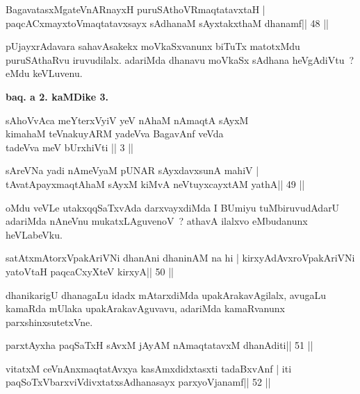 \begin{shl}
BagavatasxMgateVnARnayxH puruSAthoVR\s maqtatavxtaH |
paqcACxmayxtoV\s maqtatavxsayx sAdhanaM sAyxtakxthaM dhanamf\hfill || 48 ||
\end{shl}

\begin{artha}
pUjayxrAdavara sahavAsakekx moVkaSxvanunx biTuTx matotxMdu puruSAthaRvu iruvudilalx. adariMda dhanavu moVkaSx sAdhana heVgAdiVtu~? eMdu keVLuvenu.
\end{artha}

\begin{center}
\textbf{baq. a 2. kaMDike 3.}
\end{center}

\begin{shl}
sAhoVvAca meYterxVyiV yeV nAhaM nAmaqtA sAyxM\\
kimahaM teVnakuyARM yadeVva BagavAnf veVda\\
tadeVva meV bUrxhiVti || 3 ||
\end{shl}

\begin{shl}
sAreVNa yadi nAmeVyaM pUNAR sAyxdavxsunA mahiV |
tAvatA\s payxmaqtA\s haM sAyxM kiMvA neVtuyxcayxtAM yathA\hfill || 49 ||
\end{shl}

\begin{artha}
oMdu veVLe utakxqqSaTxvAda darxvayxdiMda I BUmiyu tuMbiruvudAdarU adariMda nAneVnu mukatxLAguvenoV~? athavA ilalxvo eMbudanunx heVLabeVku.
\end{artha}

\begin{shl}
satAtxmAtorxVpakAriVNi dhanAni dhaninAM na hi |
kirxyAdAvxroVpakAriVNi yatoV\s taH paqcaCxyXteV kirxyA\hfill || 50 ||
\end{shl}

\begin{artha}
dhanikarigU dhanagaLu idadx mAtarxdiMda upakArakavAgilalx, avugaLu
kamaRda mUlaka upakArakavAguvavu, adariMda kamaRvanunx
parxshinxsutetxVne.
\end{artha}


\begin{shl}
parxtAyxha paqSaTxH sAvxM jAyAM nAmaqtatavxM dhanAditi\hfill || 51 ||
\end{shl}

\begin{shl}
vitatxM ceVnAnxmaqtatAvxya kasAmxdidxtasxti tadaBxvAnf |
iti paqSoTxV\s barxviVdivxtatxsAdhanasayx parxyoVjanamf\hfill || 52 ||
\end{shl}

